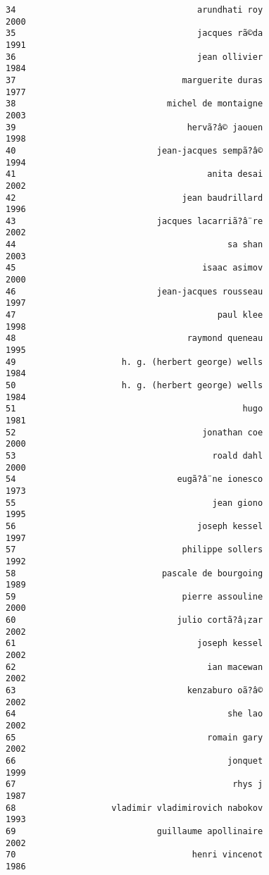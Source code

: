 \documentclass[
]{report}
\begin{document}
\begin{verbatim}
34                                    arundhati roy                2000
35                                    jacques rã©da                1991
36                                    jean ollivier                1984
37                                 marguerite duras                1977
38                              michel de montaigne                2003
39                                  hervã?â© jaouen                1998
40                            jean-jacques sempã?â©                1994
41                                      anita desai                2002
42                                 jean baudrillard                1996
43                            jacques lacarriã?â¨re                2002
44                                          sa shan                2003
45                                     isaac asimov                2000
46                            jean-jacques rousseau                1997
47                                        paul klee                1998
48                                  raymond queneau                1995
49                     h. g. (herbert george) wells                1984
50                     h. g. (herbert george) wells                1984
51                                             hugo                1981
52                                     jonathan coe                2000
53                                       roald dahl                2000
54                                eugã?â¨ne ionesco                1973
55                                       jean giono                1995
56                                    joseph kessel                1997
57                                 philippe sollers                1992
58                             pascale de bourgoing                1989
59                                 pierre assouline                2000
60                                julio cortã?â¡zar                2002
61                                    joseph kessel                2002
62                                      ian macewan                2002
63                                  kenzaburo oã?â©                2002
64                                          she lao                2002
65                                      romain gary                2002
66                                          jonquet                1999
67                                           rhys j                1987
68                   vladimir vladimirovich nabokov                1993
69                            guillaume apollinaire                2002
70                                   henri vincenot                1986

\end{verbatim}
\end{document}

